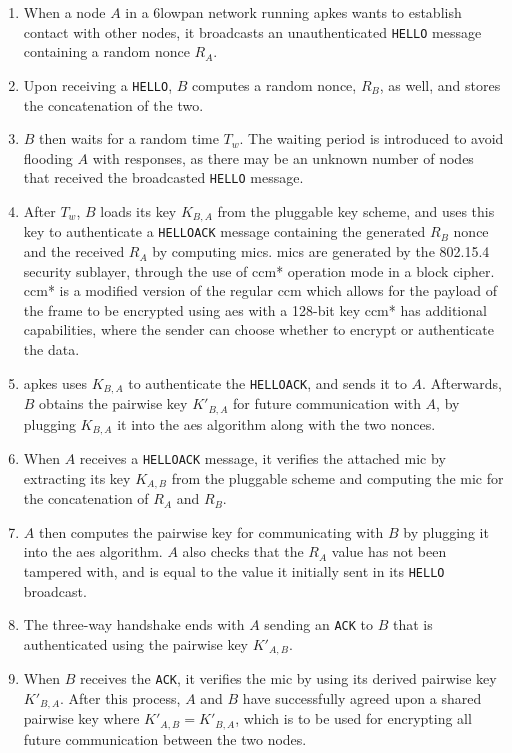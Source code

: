\begin{enumerate}

\item When a node $A$ in a \gls{6lowpan} network running \gls{apkes} wants to establish contact with other nodes, it broadcasts an unauthenticated \texttt{HELLO} message containing a random nonce $R_A$.

\item Upon receiving a \texttt{HELLO}, $B$ computes a random nonce, $R_B$, as well, and stores the concatenation of the two.

\item $B$ then waits for a random time $T_w$. The waiting period is introduced to avoid flooding $A$ with responses, as there may be an unknown number of nodes that received the broadcasted \texttt{HELLO} message.

\item After $T_w$, $B$ loads its key $K_{B,A}$ from the pluggable key scheme, and uses this key to authenticate a \texttt{HELLOACK} message containing the generated $R_B$ nonce and the received $R_A$ by computing \gls{mic}s. \gls{mic}s are generated by the 802.15.4 security sublayer, through the use of \gls{ccm}* operation mode in a block cipher. \gls{ccm}* is a modified version of the regular \gls{ccm} which allows for the payload of the frame to be encrypted using \gls{aes} with a 128-bit key \cite{krentz20136lowpan} \gls{ccm}* has additional capabilities, where the sender can choose whether to encrypt or authenticate the data.

\item \gls{apkes} uses $K_{B,A}$ to authenticate the \texttt{HELLOACK}, and sends it to $A$. Afterwards, $B$ obtains the pairwise key $K'_{B,A}$ for future communication with $A$, by plugging $K_{B,A}$ it into the \gls{aes} algorithm along with the two nonces.

\item When $A$ receives a \texttt{HELLOACK} message, it verifies the attached \gls{mic} by extracting its key $K_{A,B}$ from the pluggable scheme and computing the \gls{mic} for the concatenation of $R_A$ and $R_B$.

\item $A$ then computes the pairwise key for communicating with $B$ by plugging it into the \gls{aes} algorithm. $A$ also checks that the $R_A$ value has not been tampered with, and is equal to the value it initially sent in its \texttt{HELLO} broadcast.

\item The three-way handshake ends with $A$ sending an \texttt{ACK} to $B$ that is authenticated using the pairwise key $K'_{A,B}$.

\item When $B$ receives the \texttt{ACK}, it verifies the \gls{mic} by using its derived pairwise key $K'_{B,A}$. After this process, $A$ and $B$ have successfully agreed upon a shared pairwise key where $K'_{A,B} = K'_{B,A}$, which is to be used for encrypting all future communication between the two nodes.

\end{enumerate}

